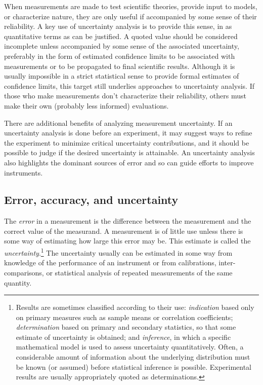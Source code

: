 \documentclass[12pt,twoside,english]{article}\usepackage[]{graphicx}\usepackage[]{color}
\begin{document}
{{\begin{appendices}
When measurements are made to test scientific theories, provide input to models, or characterize nature, they are only useful if accompanied by some sense of their reliability. A key use of uncertainty analysis is to provide this sense, in as quantitative terms as can be justified. A quoted value should be considered incomplete unless accompanied by some sense of the associated uncertainty, preferably in the form of estimated confidence limits to be associated with measurements or to be propagated to final scientific results. Although it is usually impossible in a strict statistical sense to provide formal estimates of confidence limits, this target still underlies approaches to uncertainty analysis. If those who make measurements don't characterize their reliability, others must make their own (probably less informed) evaluations. 

There are additional benefits of analyzing measurement uncertainty. If an uncertainty analysis is done before an experiment, it may suggest ways to refine the experiment to minimize critical uncertainty contributions, and it should be possible to judge if the desired uncertainty is attainable. An uncertainty analysis also highlights the dominant sources of error and so can guide efforts to improve instruments. 


\subsection{Error, accuracy, and uncertainty}

The \emph{error} in a measurement is the difference between the measurement and the correct value of the measurand. A measurement is of little use unless there is some way of estimating how large this error may be. This estimate is called the \emph{uncertainty}.\footnote{Results are sometimes classified according to their use: \textit{indication} based only on primary measures such as sample means or correlation coefficients; \textit{determination} based on primary and secondary statistics, so that some estimate of uncertainty is obtained; and 
\textit{inference}, in which a specific mathematical model is used to assess uncertainty quantitatively. Often, a considerable amount of information about the underlying distribution must be known (or assumed) before statistical inference is possible. Experimental results are usually appropriately quoted as determinations.} The uncertainty usually can be estimated in some way from knowledge of the performance of an instrument or from calibrations, inter-comparisons, or statistical analysis of repeated measurements of the same quantity. 


\end{appendices}}}
\end{document}
